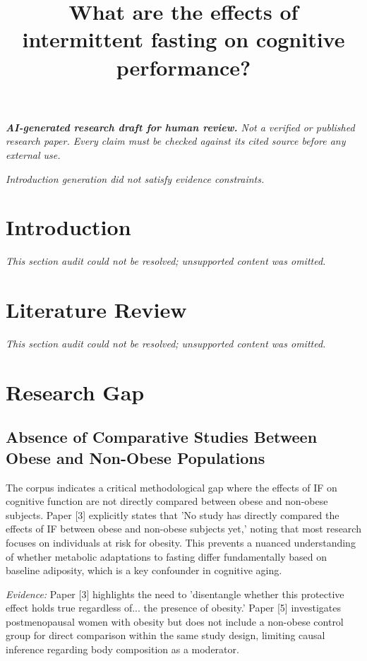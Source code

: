 \documentclass[11pt]{article}
\title{What are the effects of intermittent fasting on cognitive performance?}
\date{}
\begin{document}
\maketitle
\textit{\textbf{AI-generated research draft for human review.} Not a verified or published research paper. Every claim must be checked against its cited source before any external use.}\par

\textit{Introduction generation did not satisfy evidence constraints.}

\section{Introduction}
\textit{This section audit could not be resolved; unsupported content was omitted.}

\section{Literature Review}
\textit{This section audit could not be resolved; unsupported content was omitted.}

\section{Research Gap}
\subsection{Absence of Comparative Studies Between Obese and Non-Obese Populations}
The corpus indicates a critical methodological gap where the effects of IF on cognitive function are not directly compared between obese and non-obese subjects. Paper [3] explicitly states that 'No study has directly compared the effects of IF between obese and non-obese subjects yet,' noting that most research focuses on individuals at risk for obesity. This prevents a nuanced understanding of whether metabolic adaptations to fasting differ fundamentally based on baseline adiposity, which is a key confounder in cognitive aging.

\textit{Evidence:} Paper [3] highlights the need to 'disentangle whether this protective effect holds true regardless of... the presence of obesity.' Paper [5] investigates postmenopausal women with obesity but does not include a non-obese control group for direct comparison within the same study design, limiting causal inference regarding body composition as a moderator.
\end{document}
